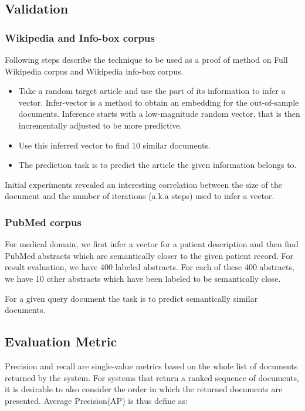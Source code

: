 \documentclass[12pt,a4paper] {article}
\begin{document}
\subsection*{Validation}

\subsubsection*{Wikipedia and Info-box corpus}
Following steps describe the technique to be used as a proof of method on Full Wikipedia corpus and Wikipedia info-box corpus. 

\begin{itemize}
	
	
	
	\item Take a random target article and use the part of its information to infer a vector. Infer-vector is a method to obtain an embedding for the out-of-sample documents. Inference starts with a low-magnitude random vector, that is then incrementally adjusted to be more predictive.
	
	\item Use this inferred vector to find 10 similar documents.
	\item The prediction task is to predict the article the given information belongs to.
	
\end{itemize}


Initial experiments revealed an interesting correlation between the size of the document and the number of iterations (a.k.a steps)  used to infer a vector.

\subsubsection*{PubMed corpus}

For medical domain, we first infer a vector for a patient description and then find PubMed abstracts which are semantically closer to the given patient record.
For result evaluation, we have 400 labeled abstracts. For each of these 400 abstracts, we have 10 other abstracts which have been labeled to be semantically close. 

For a given query document the task is to predict semantically similar documents.



\subsection*{Evaluation Metric}
Precision and recall are single-value metrics based on the whole list of documents returned by the system. For systems that return a ranked sequence of documents, it is desirable to also consider the order in which the returned documents are presented. Average Precision(AP) is thus define as:
\end{document}
